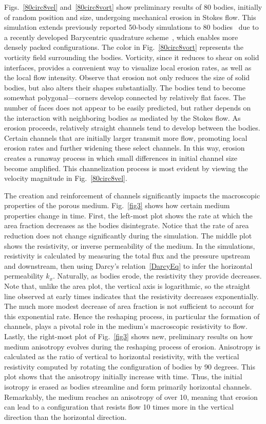 \documentclass[11pt]{article}
\begin{document}
Figs.~\ref{80circ8vel} and~\ref{80circ8vort} show preliminary results of 80 bodies, initially of random position and size, undergoing mechanical erosion in Stokes flow. This simulation extends previously reported 50-body simulations to 80 bodies~\cite{Quaife2018} due to a recently developed Barycentric quadrature scheme~\cite{bar2014, bar-wu-vee2015, chi-moo-qua2019}, which enables more densely packed configurations. The color in Fig.~\ref{80circ8vort} represents the vorticity field surrounding the bodies. Vorticity, since it reduces to shear on solid interfaces, provides a convenient way to visualize local erosion rates, as well as the local flow intensity.  Observe that erosion not only reduces the size of solid bodies, but also alters their shapes substantially. The bodies tend to become somewhat polygonal---corners develop connected by relatively flat faces. The number of faces does not appear to be easily predicted, but rather depends on the interaction with neighboring bodies as mediated by the Stokes flow. As erosion proceeds, relatively straight channels tend to develop between the bodies. Certain channels that are initially larger transmit more flow, promoting local erosion rates and further widening these select channels. In this way, erosion creates a runaway process in which small differences in initial channel size become amplified. This channelization process is most evident by viewing the velocity magnitude in Fig.~\ref{80circ8vel}.
 
The creation and reinforcement of channels significantly impacts the macroscopic properties of the porous medium. Fig.~\ref{fig3} shows how certain medium properties change in time. First, the left-most plot shows the rate at which the area fraction decreases as the bodies disintegrate. Notice that the rate of area reduction does not change significantly during the simulation. The middle plot shows the resistivity, or inverse permeability of the medium. In the simulations, resistivity is calculated by measuring the total flux and the pressure upstream and downstream, then using Darcy's relation~\eqref{DarcyEq} to infer the horizontal permeability $k_x$. Naturally, as bodies erode, the resistivity they provide decreases. Note that, unlike the area plot, the vertical axis is logarithmic, so the straight line observed at early times indicates that the resistivity decreases exponentially.  The much more modest decrease of area fraction is not sufficient to account for this exponential rate. Hence the reshaping process, in particular the formation of channels, plays a pivotal role in the medium's macroscopic resistivity to flow. Lastly, the right-most plot of Fig.~\ref{fig3} shows new, preliminary results on how medium anisotropy evolves during the reshaping process of erosion. Anisotropy is calculated as the ratio of vertical to horizontal resistivity, with the vertical resistivity computed by rotating the configuration of bodies by 90 degrees. This plot shows that the anisotropy initially increase with time. Thus, the initial isotropy is erased as bodies streamline and form primarily horizontal channels. Remarkably, the medium reaches an anisotropy of over 10, meaning that erosion can lead to a configuration that resists flow 10 times more in the vertical direction than the horizontal direction.
\end{document}
